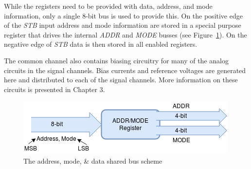 \documentclass[12pt,oneside,final]{siuethesis}
\theoremstyle{definition}
\begin{document}
\par While the registers need to be provided with data, address, and mode information, only a single 8-bit bus is used to provide this. On the positive edge of the \emph{STB} input address and mode information are stored in a special purpose register that drives the internal \emph{ADDR} and \emph{MODE} busses (see Figure~\ref{fig:addrmode}). On the negative edge of \emph{STB} data is then stored in all enabled registers.
\par The common channel also contains biasing circuitry for many of the analog circuits in the signal channels. Bias currents and reference voltages are generated here and distributed to each of the signal channels. More information on these circuits is presented in Chapter 3.

\begin{figure}[htbp!]
\centering
\includegraphics[scale=.7,keepaspectratio=true]{./ch2_figures/data_bus.png} 
\caption{The address, mode, \& data shared bus scheme}
\label{fig:addrmode}
\end{figure}
\end{document}
